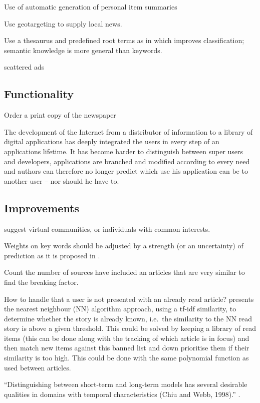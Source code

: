 
Use of automatic generation of personal item summaries \cite{fulltext.pdf}


Use geotargeting to supply local news.

Use a thesaurus and predefined root terms as in \cite{10-1-1-19-5583} which improves classification; semantic knowledge is more general than keywords.

scattered ads \cite{kristin_fredrik.pdf}

\subsection{Functionality}
Order a print copy of the newspaper



The development of the Internet from a distributor of information to a library of digital applications has deeply integrated the users in every step of an applications lifetime. It has become harder to distinguish between super users and developers, applications are branched and modified according to every need and authors can therefore no longer predict which use his application can be to another user -- nor should he have to.

\subsection{Improvements}
\cite{Personalizing-your-electronic-newspaper.pdf} suggest virtual communities, or individuals with common interests.

Weights on key words should be adjusted by a strength (or an uncertainty) of prediction as it is proposed in \cite{10.1.1.45.5230.pdf}.

Count the number of sources have included an articles that are very similar to find the breaking factor.

How to handle that a user is not presented with an already read article? \cite{User-Modeling-for-Adaptive-News-Access.pdf} presents the nearest neighbour (NN) algorithm approach, using a tf-idf similarity, to determine whether the story is already known, i.e.\ the similarity to the NN read story is above a given threshold. This could be solved by keeping a library of read items (this can be done along with the tracking of which article is in focus) and then match new items against this banned list and down prioritise them if their similarity is too high. This could be done with the same polynomial function as used between articles.

``Distinguishing between short-term and long-term models has several desirable qualities in domains with temporal characteristics (Chiu and Webb, 1998).'' \cite{User-Modeling-for-Adaptive-News-Access.pdf}.


